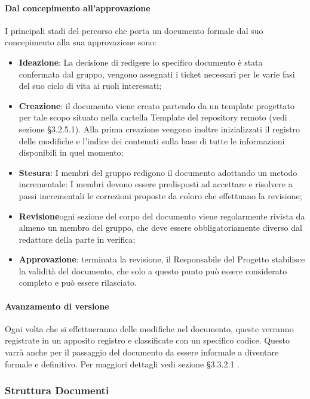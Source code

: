             \paragraph{Dal concepimento all’approvazione }
                I principali stadi del percorso che porta un documento formale dal suo concepimento alla sua approvazione sono:
                \begin{itemize}
                    \item\textbf{Ideazione}:  La decisione di redigere lo specifico documento è stata confermata dal gruppo, vengono assegnati i ticket necessari per le varie fasi del suo ciclo di vita ai ruoli interessati;
                    \item\textbf{Creazione}: il documento viene creato partendo da un template progettato per tale scopo situato nella cartella Template del repository remoto (vedi sezione §3.2.5.1). Alla prima creazione vengono inoltre inizializzati il registro delle modifiche e l’indice dei contenuti sulla base di tutte le informazioni disponibili in quel momento;
                    \item\textbf{Stesura}: I membri del gruppo redigono il documento adottando un metodo incrementale: I membri devono essere predisposti ad accettare e risolvere a passi incrementali le correzioni proposte da coloro che effettuano la revisione;
                    \item\textbf{Revisione}ogni sezione del corpo del documento viene regolarmente rivista da almeno un membro del gruppo, che deve essere obbligatoriamente diverso dal redattore della parte in verifica;
                    \item\textbf{Approvazione}: terminata la revisione, il Responsabile del Progetto stabilisce la validità del documento, che solo a questo punto può essere considerato completo e può essere rilasciato.
                \end{itemize}
            \paragraph{Avanzamento di versione}
                Ogni volta che si effettueranno delle modifiche nel documento, queste verranno registrate in un apposito registro e classificate con un specifico codice. Questo varrà anche per il passaggio del documento da essere informale a diventare formale e definitivo.
                Per maggiori dettagli vedi sezione §3.3.2.1 .


        \subsubsection{Struttura Documenti}

